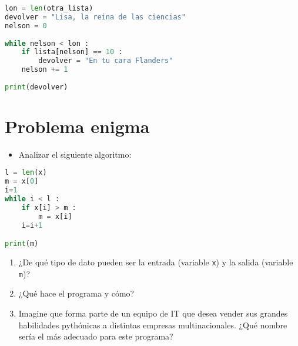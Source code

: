 \documentclass{article}
\begin{document}
\begin{lstlisting}[language=Python]
lon = len(otra_lista)
devolver = "Lisa, la reina de las ciencias"
nelson = 0
    
while nelson < lon :
	if lista[nelson] == 10 :
		devolver = "En tu cara Flanders"
	nelson += 1
        
print(devolver)

\end{lstlisting}


\section{Problema enigma}
\begin{itemize}
    \item Analizar el siguiente algoritmo:
\end{itemize}
\begin{lstlisting}[language=Python]
l = len(x)
m = x[0]
i=1
while i < l :
	if x[i] > m :
		m = x[i]
	i=i+1

print(m)

\end{lstlisting}
\begin{enumerate}
    \item ¿De qué tipo de dato pueden ser la entrada (variable \texttt{x}) y la salida (variable \texttt{m})?
    \item ¿Qué hace el programa y cómo?
    \item Imagine que forma parte de un equipo de IT que desea vender sus grandes habilidades pythónicas a distintas empresas multinacionales. ¿Qué nombre sería el más adecuado para este programa?
\end{enumerate}
\end{document}
